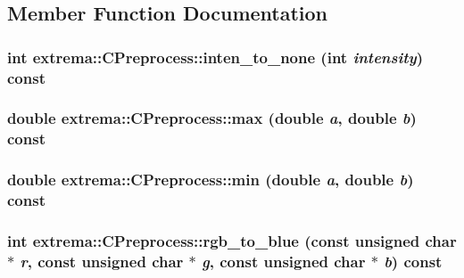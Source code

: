 \subsection{Member Function Documentation}
\hypertarget{classextrema_1_1CPreprocess_b7634e3b764a1529cc27df75086d5d75}{
\subsubsection[inten\_\-to\_\-none]{\setlength{\rightskip}{0pt plus 5cm}int extrema::CPreprocess::inten\_\-to\_\-none (int {\em intensity}) const}}
\label{classextrema_1_1CPreprocess_b7634e3b764a1529cc27df75086d5d75}


\hypertarget{classextrema_1_1CPreprocess_81fe18ae07ebd2d372821336df1ae1f5}{
\subsubsection[max]{\setlength{\rightskip}{0pt plus 5cm}double extrema::CPreprocess::max (double {\em a}, double {\em b}) const}}
\label{classextrema_1_1CPreprocess_81fe18ae07ebd2d372821336df1ae1f5}


\hypertarget{classextrema_1_1CPreprocess_ec7e0ba304457a257b1e531c79b06667}{
\subsubsection[min]{\setlength{\rightskip}{0pt plus 5cm}double extrema::CPreprocess::min (double {\em a}, double {\em b}) const}}
\label{classextrema_1_1CPreprocess_ec7e0ba304457a257b1e531c79b06667}


\hypertarget{classextrema_1_1CPreprocess_8e2a21dda19221e93b356c5c5ca5f671}{
\subsubsection[rgb\_\-to\_\-blue]{\setlength{\rightskip}{0pt plus 5cm}int extrema::CPreprocess::rgb\_\-to\_\-blue (const unsigned char $\ast$ {\em r}, const unsigned char $\ast$ {\em g}, const unsigned char $\ast$ {\em b}) const}}
\label{classextrema_1_1CPreprocess_8e2a21dda19221e93b356c5c5ca5f671}


